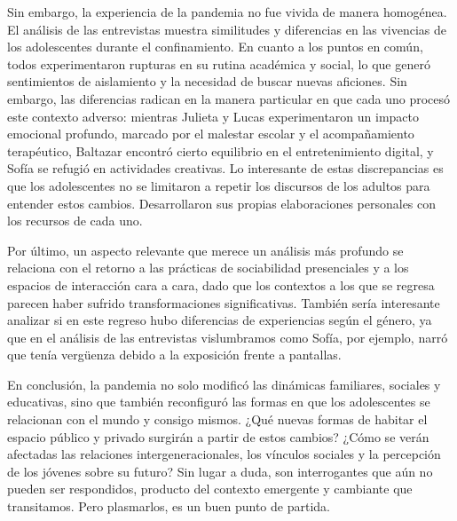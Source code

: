 \begin{refsection}
Sin embargo, la experiencia de la pandemia no fue vivida de manera homogénea. El análisis de las entrevistas muestra similitudes y diferencias en las vivencias de los adolescentes durante el confinamiento. En cuanto a los puntos en común, todos experimentaron rupturas en su rutina académica y social, lo que generó sentimientos de aislamiento y la necesidad de buscar nuevas aficiones. Sin embargo, las diferencias radican en la manera particular en que cada uno procesó este contexto adverso: mientras Julieta y Lucas experimentaron un impacto emocional profundo, marcado por el malestar escolar y el acompañamiento terapéutico, Baltazar encontró cierto equilibrio en el entretenimiento digital, y Sofía se refugió en actividades creativas. Lo interesante de estas discrepancias es que los adolescentes no se limitaron a repetir los discursos de los adultos para entender estos cambios. Desarrollaron sus propias elaboraciones personales con los recursos de cada uno.

Por último, un aspecto relevante que merece un análisis más profundo se relaciona con el retorno a las prácticas de sociabilidad presenciales y a los espacios de interacción cara a cara, dado que los contextos a los que se regresa parecen haber sufrido transformaciones significativas. También sería interesante analizar si en este regreso hubo diferencias de experiencias según el género, ya que en el análisis de las entrevistas vislumbramos como Sofía, por ejemplo, narró que tenía vergüenza debido a la exposición frente a pantallas.

En conclusión, la pandemia no solo modificó las dinámicas familiares, sociales y educativas, sino que también reconfiguró las formas en que los adolescentes se relacionan con el mundo y consigo mismos. ¿Qué nuevas formas de habitar el espacio público y privado surgirán a partir de estos cambios? ¿Cómo se verán afectadas las relaciones intergeneracionales, los vínculos sociales y la percepción de los jóvenes sobre su futuro? Sin lugar a duda, son interrogantes que aún no pueden ser respondidos, producto del contexto emergente y cambiante que transitamos. Pero plasmarlos, es un buen punto de partida.


\section*{\refname}
\printbibliography[heading=none]
\end{refsection}

